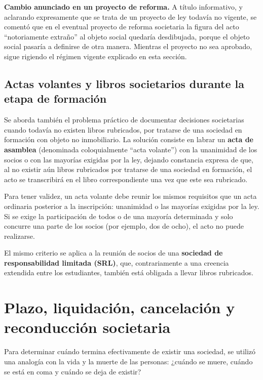 \documentclass[12pt,oneside]{book}
\begin{document}
\begin{note}
\textbf{Cambio anunciado en un proyecto de reforma.} A título informativo, y aclarando expresamente que se trata de un proyecto de ley todavía no vigente, se comentó que en el eventual proyecto de reforma societaria la figura del acto ``notoriamente extraño'' al objeto social quedaría desdibujada, porque el objeto social pasaría a definirse de otra manera. Mientras el proyecto no sea aprobado, sigue rigiendo el régimen vigente explicado en esta sección.
\end{note}

\subsection{Actas volantes y libros societarios durante la etapa de formación}

Se aborda también el problema práctico de documentar decisiones societarias cuando todavía no existen libros rubricados, por tratarse de una sociedad en formación con objeto no inmobiliario. La solución consiste en labrar un \textbf{acta de asamblea} (denominada coloquialmente ``acta volante'') con la unanimidad de los socios o con las mayorías exigidas por la ley, dejando constancia expresa de que, al no existir aún libros rubricados por tratarse de una sociedad en formación, el acto se transcribirá en el libro correspondiente una vez que este sea rubricado.

\begin{important}
Para tener validez, un acta volante debe reunir los mismos requisitos que un acta ordinaria posterior a la inscripción: unanimidad o las mayorías exigidas por la ley. Si se exige la participación de todos o de una mayoría determinada y solo concurre una parte de los socios (por ejemplo, dos de ocho), el acto no puede realizarse.
\end{important}

El mismo criterio se aplica a la reunión de socios de una \textbf{sociedad de responsabilidad limitada (SRL)}, que, contrariamente a una creencia extendida entre los estudiantes, también está obligada a llevar libros rubricados.

\section{Plazo, liquidación, cancelación y reconducción societaria}
\label{sec:reconduccion}

Para determinar cuándo termina efectivamente de existir una sociedad, se utilizó una analogía con la vida y la muerte de las personas: ¿cuándo se muere, cuándo se está en coma y cuándo se deja de existir?
\end{document}
